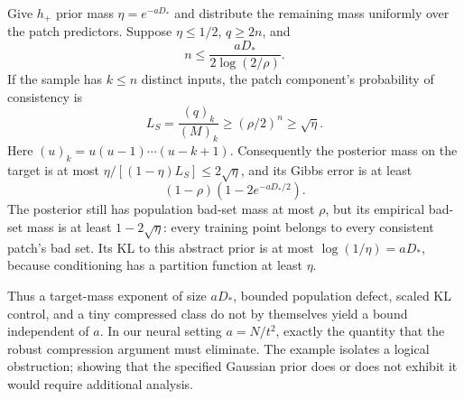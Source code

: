 Give $h_+$ prior mass $\eta=e^{-aD_*}$ and distribute the remaining mass
uniformly over the patch predictors. Suppose $\eta\le1/2$, $q\ge2n$, and
\[
 n\le\frac{aD_*}{2\log(2/\rho)}.
\]
If the sample has $k\le n$ distinct inputs, the patch component's probability
of consistency is
\[
 L_S=\frac{(q)_k}{(M)_k}\ge(\rho/2)^n\ge\sqrt\eta.
\]
Here $(u)_k=u(u-1)\cdots(u-k+1)$. Consequently the posterior mass on the
target is at most
$\eta/[(1-\eta)L_S]\le2\sqrt\eta$, and its Gibbs error is at least
\[
 (1-\rho)(1-2e^{-aD_*/2}).
\]
The posterior still has population bad-set mass at most $\rho$, but its
empirical bad-set mass is at least $1-2\sqrt\eta$: every training point
belongs to every consistent patch's bad set. Its KL to this abstract prior
is at most $\log(1/\eta)=aD_*$, because conditioning has a partition
function at least $\eta$.

Thus a target-mass exponent of size $aD_*$, bounded population defect,
scaled KL control, and a tiny compressed class do not by themselves yield
a bound independent of $a$. In our neural setting $a=N/t^2$, exactly the
quantity that the robust compression argument must eliminate. The example
isolates a logical obstruction; showing that the specified Gaussian prior
does or does not exhibit it would require additional analysis.
